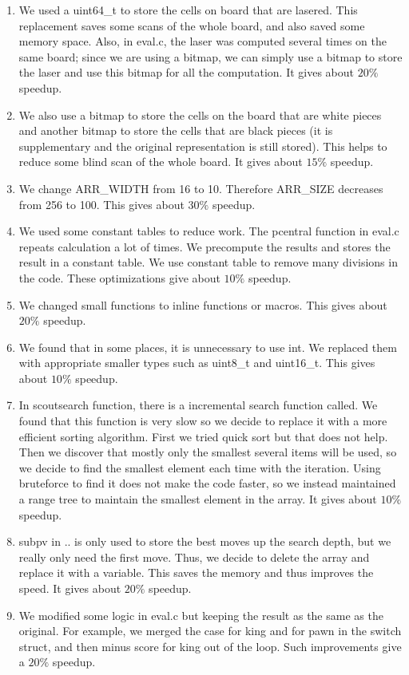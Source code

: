 \documentclass[10pt,twosidep]{article}
\begin{document}
\begin{enumerate}
	\item We used a uint64\_t to store the cells on board that are lasered. This replacement saves some scans of the whole board, and also saved some memory space. Also, in eval.c, the laser was computed several times on the same board; since we are using a bitmap, we can simply use a bitmap to store the laser and use this bitmap for all the computation. It gives about $20\%$ speedup.

	\item We also use a bitmap to store the cells on the board that are white pieces and another bitmap to store the cells that are black pieces (it is supplementary and the original representation is still stored). This helps to reduce some blind scan of the whole board.  It gives about $15\%$ speedup.

	\item We change ARR\_WIDTH from 16 to 10. Therefore ARR\_SIZE decreases from 256 to 100. This gives about $30\%$ speedup.
	\item We used some constant tables to reduce work. 
	The pcentral function in eval.c repeats calculation a lot of times. We precompute the results and stores the result in a constant table.
	We use constant table to remove many divisions in the code.
	These optimizations give about $10\%$ speedup.
	\item We changed small functions to inline functions or macros. This gives about $20\%$ speedup.
	\item We found that in some places, it is unnecessary to use int. We replaced them with appropriate smaller types such as uint8\_t and uint16\_t. This gives about $10\%$ speedup.

	\item In scoutsearch function, there is a incremental search function called. We found that this function is very slow so we decide to replace it with a more efficient sorting algorithm. First we tried quick sort but that does not help. Then we discover that mostly only the smallest several items will be used, so we decide to find the smallest element each time with the iteration. Using bruteforce to find it does not make the code faster, so we instead maintained a range tree to maintain the smallest element in the array. It gives about $10\%$ speedup. 
	
	\item subpv in .. is only used to store the best moves up the search depth, but we really only need the first move. Thus, we decide to delete the array and replace it with a variable. This saves the memory and thus improves the speed. It gives about $20\%$ speedup. 
	
	\item We modified some logic in eval.c but keeping the result as the same as the original. For example, we merged the case for king and for pawn in the switch struct, and then minus score for king out of the loop. Such improvements give a $20\%$ speedup. 	
\end{enumerate}
\end{document}
